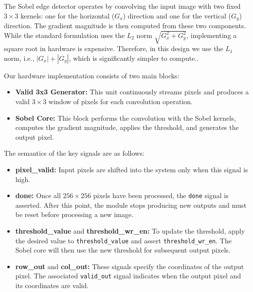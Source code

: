 \documentclass[a4paper,12pt]{article}
\begin{document}
The Sobel edge detector operates by convolving the input image with two fixed
\(3 \times 3\) kernels: one for the horizontal (\(G_x\)) direction and one for the
vertical (\(G_y\)) direction. The gradient magnitude is then computed from these
two components. While the standard formulation uses the \(L_2\) norm
\(\sqrt{G_x^2 + G_y^2}\), implementing a square root in hardware is expensive.
Therefore, in this design we use the \(L_1\) norm, i.e.,
\(|G_x| + |G_y|\), which is significantly simpler to compute..

Our hardware implementation consists of two main blocks:

\begin{itemize}
	\item \textbf{Valid 3x3 Generator:}
	      This unit continuously streams pixels and produces a valid \(3 \times 3\)
	      window of pixels for each convolution operation.

	\item \textbf{Sobel Core:}
	      This block performs the convolution with the Sobel kernels, computes the
	      gradient magnitude, applies the threshold, and generates the output pixel.
\end{itemize}

The semantics of the key signals are as follows:

\begin{itemize}
	\item \textbf{pixel\_valid:}
	      Input pixels are shifted into the system only when this signal is high.

	\item \textbf{done:}
	      Once all \(256 \times 256\) pixels have been processed, the \texttt{done}
	      signal is asserted. After this point, the module stops producing new
	      outputs and must be reset before processing a new image.

	\item \textbf{threshold\_value} and \textbf{threshold\_wr\_en:}
	      To update the threshold, apply the desired value to \texttt{threshold\_value}
	      and assert \texttt{threshold\_wr\_en}. The Sobel core will then use the new
	      threshold for subsequent output pixels.

	\item \textbf{row\_out} and \textbf{col\_out:}
	      These signals specify the coordinates of the output pixel. The associated
	      \texttt{valid\_out} signal indicates when the output pixel and its
	      coordinates are valid.
\end{itemize}
\end{document}
